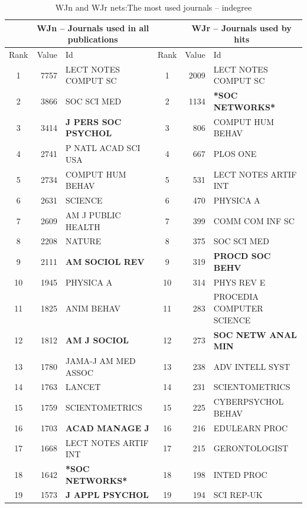\documentclass[11pt]{article} %
\begin{document}
\begin{table}
\begin{center}
\caption{WJn and WJr nets:\label{jourind} The most used journals -- indegree}\medskip
\small
\renewcommand{\arraystretch}{0.95}
\begin{tabular}{c|r|l||c|r|l} \hline \hline
& \multicolumn{2}{c}{WJn -- Journals used in all publications}		 &  &\multicolumn{2}{c}{WJr -- Journals used by hits}  \\ \hline \hline
 Rank&   	Value&   	Id&   	Rank&   	Value&   	Id \\ \hline
1	&7757	& LECT NOTES COMPUT SC			&  1	&2009	&LECT NOTES COMPUT SC		   \\
2	&3866	& SOC SCI MED				&  2	&1134	&\textbf{*SOC NETWORKS*}			   \\
3	&3414	& \textbf{J PERS SOC PSYCHOL}		&  3	&806	&COMPUT HUM BEHAV		   \\
4	&2741	& P NATL ACAD SCI USA			&  4	&667	&PLOS ONE			   \\
5	&2734	& COMPUT HUM BEHAV			&  5	&531	&LECT NOTES ARTIF INT		   \\
6	&2631	& SCIENCE				&  6	&470	&PHYSICA A			   \\
7	&2609	& AM J PUBLIC HEALTH			&  7	&399	&COMM COM INF SC		   \\
8	&2208	& NATURE				&  8	&375	&SOC SCI MED			   \\
9	&2111	& \textbf{AM SOCIOL REV}		& 9	&319	&\textbf{PROCD SOC BEHV}		   \\
10	&1945	& PHYSICA A				&  10	&314	&PHYS REV E			   \\
11	&1825	& ANIM BEHAV				&  11	&283	&PROCEDIA COMPUTER SCIENCE	   \\
12	&1812	& \textbf{AM J SOCIOL}			&  12	&273	&\textbf{SOC NETW ANAL MIN}		   \\
13	&1780	& JAMA-J AM MED ASSOC			&  13	&238	&ADV INTELL SYST		   \\
14	&1763	& LANCET				&  14	&231	&SCIENTOMETRICS			   \\
15	&1759	& SCIENTOMETRICS			& 15	&225	&CYBERPSYCHOL BEHAV		   \\
16	&1703	& \textbf{ACAD MANAGE J}		& 16	&216	&EDULEARN PROC			   \\
17	&1668	& LECT NOTES ARTIF INT			&  17	&215	&GERONTOLOGIST			   \\
18	&1642	&\textbf{*SOC NETWORKS*}		& 18	&198	&INTED PROC			   \\
19	&1573	&\textbf{J APPL PSYCHOL}		& 19	&194	&SCI REP-UK			   \\

\end{tabular}
\end{center}
\end{table}
\end{document}

